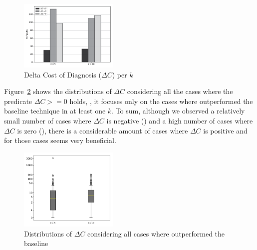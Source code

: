 \documentclass{article}
\begin{document}
\begin{figure}[tb]
		\centering
		\includegraphics[width=0.42\textwidth]{figures/performance.png}
		\vspace{-0.4cm}
		\caption{Delta Cost of Diagnosis ($\Delta{}C$) per $k$}
		\label{fig:diagnosis}
\end{figure}


Figure~\ref{fig:boxplot} shows the distributions of $\Delta{}C$ considering all the 
cases where the predicate $\Delta{}C>=0$ holds, \ie{}, it focuses only
on the cases where  outperformed the baseline technique in at least one $k$.
To sum, although we observed a relatively small number of cases where $\Delta{}C$
is negative (\numOutPerformed) and a high number of cases where $\Delta{}C$
is zero (\numEquallyPerformed), there is a
considerable amount of cases where $\Delta{}C$ is positive and for
those cases  seems very beneficial.




\begin{figure}[tb]
		\vspace{-0.2cm}
		\centering
		\includegraphics[width=0.42\textwidth]{figures/boxplot.png}
		\vspace{-0.4cm}
		\caption{Distributions of $\Delta{}C$ considering all cases where 
        outperformed the baseline}
		\label{fig:boxplot}
		\vspace{-0.2cm}
\end{figure}
\end{document}
